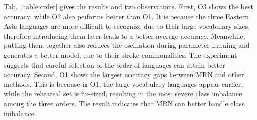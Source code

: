 \documentclass[10pt,twocolumn,letterpaper]{article}
\begin{document}
\begin{table*}[]
\begin{center}
\end{center}
\caption{Comparisons on different routing strategies.}
\label{table:e-gate}
\end{table*}

Tab.~\ref{table:order} gives the results and two observations. First, O3 shows the best accuracy, while O2 also performs better than O1. It is because the three Eastern Asia languages are more difficult to recognize due to their large vocabulary sizes, therefore introducing them later leads to a better average accuracy. Meanwhile, putting them together also reduces the oscillation during parameter learning and generates a better model, due to their stroke commonalities. The experiment suggests that careful selection of the order of languages can attain better accuracy. Second, O1 shows the largest accuracy gaps between MRN and other methods. This is because in O1, the large vocabulary languages appear earlier, while the rehearsal set is fix-sized, resulting in the most severe class imbalance among the three orders. The result indicates that MRN can better handle class imbalance.  
\end{document}
